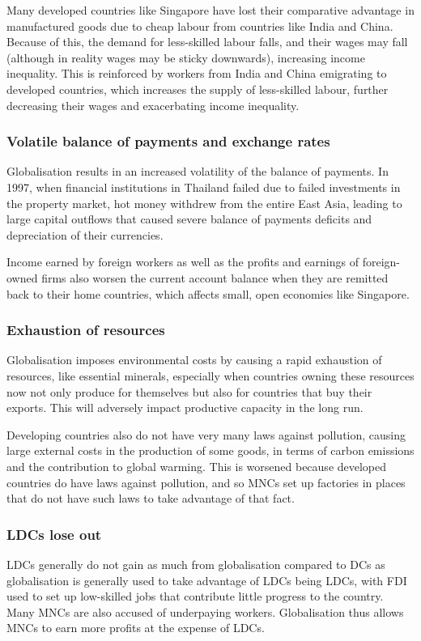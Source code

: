 \documentclass[Economics.tex]{subfiles}
\begin{document}
Many developed countries like Singapore have lost their comparative advantage in manufactured goods due to cheap labour from countries like India and China. Because of this, the demand for less-skilled labour falls, and their wages may fall (although in reality wages may be sticky downwards), increasing income inequality. This is reinforced by workers from India and China emigrating to developed countries, which increases the supply of less-skilled labour, further decreasing their wages and exacerbating income inequality.
\subsubsection{Volatile balance of payments and exchange rates}
Globalisation results in an increased volatility of the balance of payments. In 1997, when financial institutions in Thailand failed due to failed investments in the property market, hot money withdrew from the entire East Asia, leading to large capital outflows that caused severe balance of payments deficits and depreciation of their currencies.

Income earned by foreign workers as well as the profits and earnings of foreign-owned firms also worsen the current account balance when they are remitted back to their home countries, which affects small, open economies like Singapore.
\subsubsection{Exhaustion of resources}
Globalisation imposes environmental costs by causing a rapid exhaustion of resources, like essential minerals, especially when countries owning these resources now not only produce for themselves but also for countries that buy their exports. This will adversely impact productive capacity in the long run.

Developing countries also do not have very many laws against pollution, causing large external costs in the production of some goods, in terms of carbon emissions and the contribution to global warming. This is worsened because developed countries do have laws against pollution, and so MNCs set up factories in places that do not have such laws to take advantage of that fact.
\subsubsection{LDCs lose out}
LDCs generally do not gain as much from globalisation compared to DCs as globalisation is generally used to take advantage of LDCs being LDCs, with FDI used to set up low-skilled jobs that contribute little progress to the country. Many MNCs are also accused of underpaying workers. Globalisation thus allows MNCs to earn more profits at the expense of LDCs.
\end{document}
